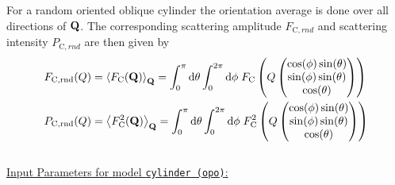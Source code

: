 For a random oriented oblique cylinder the orientation average is done over all directions of ${\bf Q}$. The corresponding scattering amplitude $F_{\mathrm{C},rnd}$ and scattering intensity $P_{\mathrm{C},rnd}$ are then given by
\begin{align}
F_{\mathrm{C,rnd}}(Q) &= \left\langle F_\mathrm{C}({\bf Q})\right\rangle_{\bf Q} = \int_0^\pi\mathrm{d}\theta \int_0^{2\pi}\mathrm{d}\phi \; F_\mathrm{C}\left(Q\begin{pmatrix}
                                       \cos(\phi)\sin(\theta) \\
                                       \sin(\phi)\sin(\theta) \\
                                       \cos(\theta)
                                     \end{pmatrix}\right) \label{eq:opo_rnd_cylF}\\
P_{\mathrm{C,rnd}}(Q) &= \left\langle F_\mathrm{C}^2({\bf Q})\right\rangle_{\bf Q} = \int_0^\pi\mathrm{d}\theta \int_0^{2\pi}\mathrm{d}\phi \; F_\mathrm{C}^2\left(Q\begin{pmatrix}
                                       \cos(\phi)\sin(\theta) \\
                                       \sin(\phi)\sin(\theta) \\
                                       \cos(\theta)
                                     \end{pmatrix}\right) \label{eq:opo_rnd_cylF2}
\end{align}
~\\
\uline{Input Parameters for model \texttt{cylinder (opo)}:}
